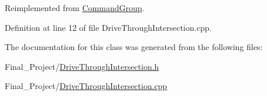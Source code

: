 Reimplemented from \hyperlink{classCommandGroup_a28ad3a1c2f6b4f9aea10efa1a824895e}{Command\-Group}.



Definition at line 12 of file Drive\-Through\-Intersection.\-cpp.



The documentation for this class was generated from the following files\-:\begin{DoxyCompactItemize}
\item 
Final\-\_\-\-Project/\hyperlink{DriveThroughIntersection_8h}{Drive\-Through\-Intersection.\-h}\item 
Final\-\_\-\-Project/\hyperlink{DriveThroughIntersection_8cpp}{Drive\-Through\-Intersection.\-cpp}\end{DoxyCompactItemize}
